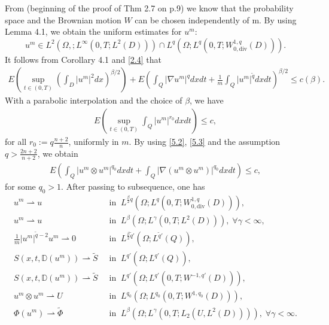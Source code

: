 \documentclass[reqno]{amsart}
\theoremstyle{definition}
\theoremstyle{remark}
\numberwithin{equation}{section} \allowdisplaybreaks
\begin{document}
From \cite{NISW} (beginning of the proof of Thm 2.7 on p.9) we know
that the probability space and the Brownian motion $W$ can be chosen
independently of m. By using Lemma 4.1, we obtain the uniform
estimates for $u^m$:  $$u^m\in L^2(\Omega,;L^\infty(0,T;L^2(D)))\cap
L^{q}(\Omega;L^q(0,T;W_{0,\text{div}}^{1,q}(D))).$$ It follows from
Corollary 4.1 and \eqref{2.4} that
\begin{equation}\label{5.2}
\begin{split}
E\left(\sup_{t\in(0,T)}\left(\int_{D}|u^m|^2dx\right)^{\beta/2}\right)+E\left(\int_Q|\nabla
u^m|^qdxdt+\frac{1}{m}\int_Q|u^m|^{\tilde{q}}dxdt\right)^{\beta/2}
\leq c(\beta).
\end{split}
\end{equation}
With a parabolic interpolation and the choice of $\beta$, we have
\begin{equation}\label{5.3}
\begin{split}
E\left(\sup_{t\in(0,T)}\int_{Q}|u^m|^{r_0}dxdt\right)\leq c,
\end{split}
\end{equation}
for all $r_0:=q\frac{n+2}{n}$, uniformly in $m$. By using
\eqref{5.2}, \eqref{5.3} and the assumption $q>\frac{2n+2}{n+2}$, we
obtain
\begin{equation}\label{5.4}
\begin{split}
E\left(\int_{Q}|u^m\otimes u^m|^{q_0}dxdt+\int_{Q}|\nabla(u^m\otimes
u^m)|^{q_0}dxdt\right)\leq c,
\end{split}
\end{equation}
for some $q_0>1$. After passing to subsequence, one has %
\begin{align}\label{5.5}
u^m\rightharpoonup u &~\mbox{ in }~  L^{\frac{\beta}{2}q} (\Omega
;L^q(0,T;W_{0,\text{div}}^{1,q}(D))),\\
\label{5.6}
u^m\rightharpoonup u& ~\mbox{ in }~  L^{\beta}(\Omega ;L^{\gamma}(0,T;L^2(D))),\; \forall \gamma<\infty,\\
\label{5.7} \frac{1}{m}|u^m|^{\tilde{q}-2}u^m\rightharpoonup 0&
~\mbox{ in }~
L^{\frac{\beta}{2}\tilde{q}'}(\Omega ;L^{\tilde{q}'}(Q)),\\
\label{5.8}
S(x,t,\mathbb{D}(u^m))\rightharpoonup \tilde{S}&  ~\mbox{ in }~  L^{q'}(\Omega;L^{q'}(Q)),\\
\label{5.9}
S(x,t,\mathbb{D}(u^m))\rightharpoonup \tilde{S}& ~\mbox{ in }~   L^{q'} (\Omega;L^{q'}(0,T;W^{-1,q'}(D))),\\
\label{5.10}
u^m\otimes u^m\rightharpoonup U&  ~\mbox{ in }~   L^{q_0}(\Omega;L^{q_0}(0,T;W^{1,q_0}(D))),\\
\label{5.11} \Phi(u^m)\rightharpoonup \tilde{\Phi}&  ~\mbox{ in }~
L^\beta (\Omega;L^\gamma(0,T;L_2(U,L^2(D)))),\; \forall
\gamma<\infty.
\end{align}
\end{document}
